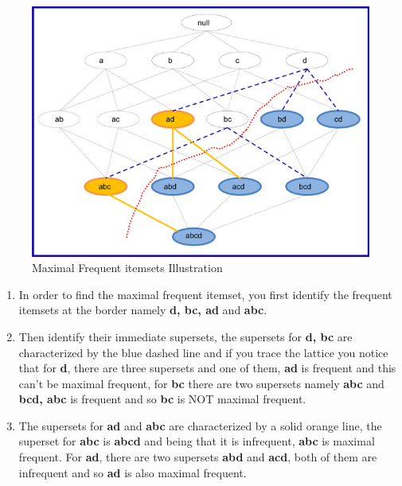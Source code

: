 \begin{figure}[H]
  \centering
  \includegraphics[width=\linewidth]{figures/maxFISExample}
  \caption{Maximal Frequent itemsets Illustration}
  \label{fig:maxFISExample}
\end{figure}


\begin{enumerate}
\item In order to find the maximal frequent itemset, you first identify the frequent itemsets at the border namely \textbf{d, bc, ad} and \textbf{abc}.
\item Then identify their immediate supersets,
the supersets for \textbf{d, bc} are characterized by the blue dashed line and if you trace the lattice you notice that for \textbf{d}, there are three supersets and one of them, \textbf{ad} is frequent and this can’t be maximal frequent,
for \textbf{bc} there are two supersets namely \textbf{abc} and \textbf{bcd, abc} is frequent and so \textbf{bc} is NOT maximal frequent.
\item The supersets for \textbf{ad} and \textbf{abc} are characterized by a solid orange line, the superset for \textbf{abc} is \textbf{abcd} and being that it is infrequent, \textbf{abc} is maximal frequent. For \textbf{ad}, there are two supersets \textbf{abd} and \textbf{acd}, both of them are infrequent and so \textbf{ad} is also maximal frequent.
\end{enumerate}



